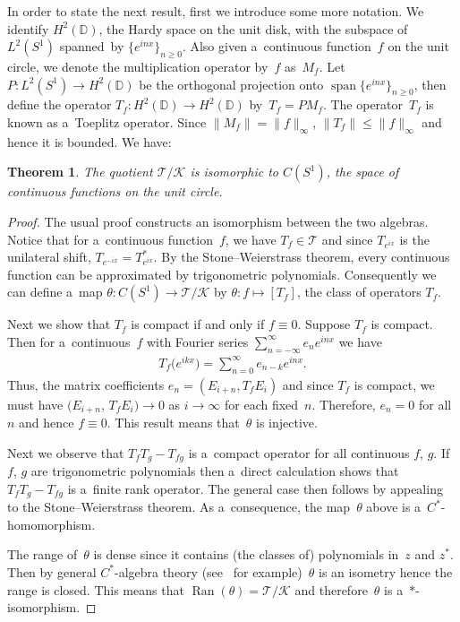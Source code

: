 \documentclass[11pt]{article}
\numberwithin{equation}{section}
\newtheorem{Theorem}{Theorem}[section]
\DeclareMathOperator{\spn}{span}
\DeclareMathOperator{\Ran}{Ran}
\begin{document}
In order to state the next result, f\/irst we introduce some more notation.
We identify $H^2({\mathbb D})$, the Hardy space on the unit disk, with the subspace of $L^2(S^1)$ spanned~by
$\{e^{inx}\}_{n\ge0}$.
Also given a~continuous function~$f$ on the unit circle, we denote the multiplication operator by~$f$ as~$M_f$.
Let $P:L^2(S^1)\to H^2({\mathbb D})$ be the orthogonal projection onto $\spn\{e^{inx}\}_{n\ge0}$, then def\/ine
the operator $T_f: H^2({\mathbb D}) \to H^2({\mathbb D})$ by~$T_f=PM_f$.
The operator~$T_f$ is known as a~Toeplitz operator.
Since $\|M_f\|=\|f\|_{\infty}$, $\|T_f\|\le \|f\|_{\infty}$ and hence it is bounded.
We have:

\begin{Theorem}
\label{toeplitz_disk}
The quotient $\mathcal{T}/\mathcal{K}$ is isomorphic to $C(S^1)$, the space of continuous functions on the unit circle.
\end{Theorem}

\begin{proof}
The usual proof constructs an isomorphism between the two algebras.
Notice that for a~continuous function~$f$, we have $T_f\in\mathcal{T}$ and since $T_{e^{ix}}$ is the unilateral shift,
$T_{e^{-ix}}=T_{e^{ix}}^*$.
By the Stone--Weierstrass theorem, every continuous function can be approximated by trigonometric polynomials.
Consequently we can def\/ine a~map $\theta: C(S^1) \to \mathcal{T}/\mathcal{K}$ by $\theta: f \mapsto [T_f]$, the class of
operators $T_f$.

Next we show that $T_f$ is compact if and only if $f\equiv 0$.
Suppose $T_f$ is compact.
Then for a~continuous~$f$ with Fourier series $ \sum\limits_{n=-\infty}^\infty e_n e^{inx}$ we have
\begin{gather*}
T_f\big(e^{ikx}\big)=\sum\limits_{n=0}^\infty e_{n-k}e^{inx}.
\end{gather*}
Thus, the matrix coef\/f\/icients $e_n=(E_{i+n},T_f E_i)$ and since $T_f$ is compact, we must have $(E_{i+n}$,
$T_f E_i)\to0$
as $i\to\infty$ for each f\/ixed~$n$.
Therefore, $e_n=0$ for all~$n$ and hence $f\equiv 0$.
This result means that~$\theta$ is injective.

Next we observe that $T_fT_g-T_{fg}$ is a~compact operator for all continuous $f$, $g$.
If $f$, $g$ are trigonometric polynomials then a~direct calculation shows that $T_fT_g-T_{fg}$ is a~f\/inite rank operator.
The general case then follows by appealing to the Stone--Weierstrass theorem.
As a~consequence, the map~$\theta$ above is a~$C^*$-homomorphism.

The range of~$\theta$ is dense since it contains (the classes of) polynomials in~$z$ and $z^*$.
Then by general $C^*$-algebra theory (see~\cite{Conway} for example)~$\theta$ is an isometry hence the range is closed.
This means that $\Ran(\theta)=\mathcal{T}/\mathcal{K}$ and therefore~$\theta$ is a~$*$-isomorphism.
\end{proof}
\setcounter{section}{2}
\setcounter{subsection}{2}
\setcounter{subsubsection}{0}
\setcounter{Theorem}{7}
\setcounter{equation}{0}
\end{document}
